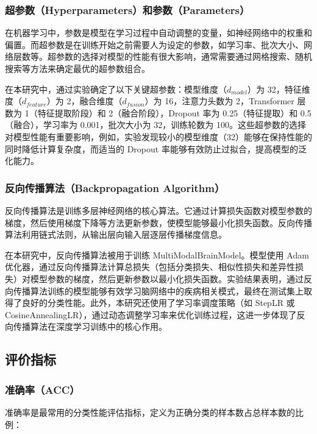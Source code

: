 \documentclass[12pt,a4paper]{article}
\begin{document}
\subsubsection{超参数（Hyperparameters）和参数（Parameters）}

在机器学习中，参数是模型在学习过程中自动调整的变量，如神经网络中的权重和偏置。而超参数是在训练开始之前需要人为设定的参数，如学习率、批次大小、网络层数等。超参数的选择对模型的性能有很大影响，通常需要通过网格搜索、随机搜索等方法来确定最优的超参数组合。

在本研究中，通过实验确定了以下关键超参数：模型维度（$d_{model}$）为 32，特征维度（$d_{feature}$）为 2，融合维度（$d_{fusion}$）为 16，注意力头数为 2，Transformer 层数为 1（特征提取阶段）和 2（融合阶段），Dropout 率为 0.25（特征提取）和 0.5（融合），学习率为 0.001，批次大小为 32，训练轮数为 100。这些超参数的选择对模型性能有重要影响，例如，实验发现较小的模型维度（32）能够在保持性能的同时降低计算复杂度，而适当的 Dropout 率能够有效防止过拟合，提高模型的泛化能力。

\subsubsection{反向传播算法（Backpropagation Algorithm）}

反向传播算法是训练多层神经网络的核心算法\cite{rumelhart1986learning}。它通过计算损失函数对模型参数的梯度，然后使用梯度下降等方法更新参数，使模型能够最小化损失函数。反向传播算法利用链式法则，从输出层向输入层逐层传播梯度信息。

在本研究中，反向传播算法被用于训练 MultiModalBrainModel。模型使用 Adam 优化器，通过反向传播算法计算总损失（包括分类损失、相似性损失和差异性损失）对模型参数的梯度，然后更新参数以最小化损失函数。实验结果表明，通过反向传播算法训练的模型能够有效学习脑网络中的疾病相关模式，最终在测试集上取得了良好的分类性能。此外，本研究还使用了学习率调度策略（如 StepLR 或 CosineAnnealingLR），通过动态调整学习率来优化训练过程，这进一步体现了反向传播算法在深度学习训练中的核心作用。

\subsection{评价指标}

\subsubsection{准确率（ACC）}

准确率是最常用的分类性能评估指标，定义为正确分类的样本数占总样本数的比例：
\end{document}

